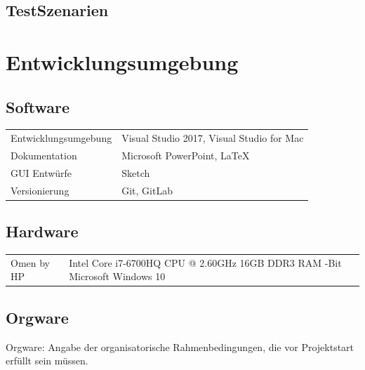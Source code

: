 \documentclass[a4paper]{scrreprt}
\begin{document}
\section{TestSzenarien}
 

\chapter{Entwicklungsumgebung}
 
\section{Software}
\begin{tabular}{lll}
Entwicklungsumgebung &  \multicolumn{2}{p{12cm}}{Visual Studio 2017, Visual Studio for Mac}\\
Dokumentation &  \multicolumn{2}{p{12cm}}{Microsoft PowerPoint, LaTeX}  \\
GUI Entwürfe & \multicolumn{2}{p{12cm}}{Sketch} \\
Versionierung & \multicolumn{2}{p{12cm}}{Git, GitLab} \\
\end{tabular}

 
\section{Hardware}
\begin{tabular}{lll}
Omen by HP &  \multicolumn{2}{p{12cm}}{Intel Core i7-6700HQ CPU @ 2.60GHz \newline 16GB DDR3 RAM  \newline 64-Bit Microsoft Windows 10}\\
\end{tabular}
 
\section{Orgware}
Orgware: Angabe der organisatorische Rahmenbedingungen, die vor Projektstart
erfüllt sein müssen.
 
\printnoidxglossaries

\listoffigures
 
\end{document}
